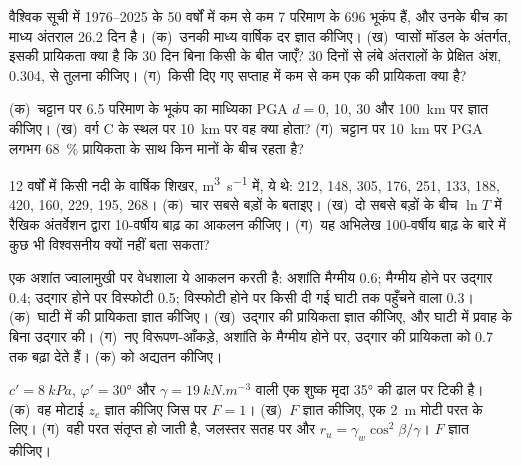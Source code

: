 \begin{exercise}[$\star\star$]\label{exo:b2:geological-hazards:5}
वैश्विक सूची में 1976--2025 के 50 वर्षों में कम से कम 7 परिमाण के 696 भूकंप हैं, और
उनके बीच का माध्य अंतराल 26.2 दिन है। (क)~उनकी माध्य वार्षिक दर ज्ञात कीजिए। (ख)~प्वासों
मॉडल के अंतर्गत, इसकी प्रायिकता क्या है कि 30 दिन बिना किसी के बीत जाएँ? 30 दिनों से लंबे अंतरालों के प्रेक्षित
अंश, 0.304, से तुलना कीजिए। (ग)~किसी दिए गए सप्ताह में कम से कम एक की
प्रायिकता क्या है?
\end{exercise}

\begin{exercise}[$\star\star$]\label{exo:b2:geological-hazards:6}
(क)~चट्टान पर 6.5 परिमाण के भूकंप का माध्यिका PGA $d = 0$, 10, 30 और
\qty{100}{km} पर ज्ञात कीजिए। (ख)~वर्ग C के स्थल पर \qty{10}{km} पर वह क्या होता? (ग)~चट्टान पर \qty{10}{km} पर
PGA लगभग \qty{68}{\percent} प्रायिकता के साथ किन मानों के बीच रहता है?
\end{exercise}

\begin{exercise}[$\star\star$]\label{exo:b2:geological-hazards:7}
12 वर्षों में किसी नदी के वार्षिक शिखर, \unit{m^3.s^{-1}} में, ये थे: 212, 148, 305, 176, 251, 133, 188,
420, 160, 229, 195, 268। (क)~चार सबसे बड़ों के  बताइए। (ख)~दो सबसे बड़ों के बीच
$\ln T$ में रैखिक अंतर्वेशन द्वारा 10-वर्षीय बाढ़ का आकलन कीजिए। (ग)~यह अभिलेख 100-वर्षीय बाढ़ के बारे में
कुछ भी विश्वसनीय क्यों नहीं बता सकता?
\end{exercise}

\begin{exercise}[$\star\star$]\label{exo:b2:geological-hazards:8}
एक अशांत ज्वालामुखी पर वेधशाला ये आकलन करती है: अशांति मैग्मीय 0.6; मैग्मीय होने पर उद्गार 0.4;
उद्गार होने पर विस्फोटी 0.5; विस्फोटी होने पर किसी दी गई घाटी तक पहुँचने वाला  0.3। (क)~घाटी में
 की प्रायिकता ज्ञात कीजिए। (ख)~उद्गार की प्रायिकता ज्ञात कीजिए, और
घाटी में प्रवाह के बिना उद्गार की। (ग)~नए विरूपण-आँकड़े, अशांति के मैग्मीय होने पर, उद्गार की प्रायिकता को
0.7 तक बढ़ा देते हैं। (क) को अद्यतन कीजिए।
\end{exercise}

\begin{exercise}[$\star\star$]\label{exo:b2:geological-hazards:9}
$c' = \qty{8}{kPa}$, $\varphi' = \ang{30}$ और $\gamma = \qty{19}{kN.m^{-3}}$ वाली एक शुष्क मृदा
\ang{35} की ढाल पर टिकी है। (क)~वह मोटाई $z_c$ ज्ञात कीजिए जिस पर $F = 1$। (ख)~$F$ ज्ञात कीजिए,
एक \qty{2}{m} मोटी परत के लिए। (ग)~वही परत संतृप्त हो जाती है, जलस्तर सतह पर और
$r_u = \gamma_w\cos^2\beta/\gamma$। $F$ ज्ञात कीजिए।
\end{exercise}

